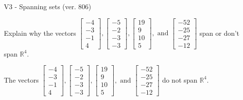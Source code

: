 \begin{exercise}
  \begin{exerciseTitle}V3 - Spanning sets (ver. 806)\end{exerciseTitle}
  \begin{exerciseStatement}
    Explain why the vectors \(\left[\begin{array}{r}
-4 \\
-3 \\
-1 \\
4
\end{array}\right] , \left[\begin{array}{r}
-5 \\
-2 \\
-3 \\
-3
\end{array}\right] , \left[\begin{array}{r}
19 \\
9 \\
10 \\
5
\end{array}\right] , \text{ and } \left[\begin{array}{r}
-52 \\
-25 \\
-27 \\
-12
\end{array}\right]\) span or don't span \(\mathbb{R}^4\). 
	


  \end{exerciseStatement}
  \begin{exerciseAnswer}
   The vectors \(\left[\begin{array}{r}
-4 \\
-3 \\
-1 \\
4
\end{array}\right] , \left[\begin{array}{r}
-5 \\
-2 \\
-3 \\
-3
\end{array}\right] , \left[\begin{array}{r}
19 \\
9 \\
10 \\
5
\end{array}\right] , \text{ and } \left[\begin{array}{r}
-52 \\
-25 \\
-27 \\
-12
\end{array}\right]\) 
  	 do not  
	span \(\mathbb{R}^4\).
  


  \end{exerciseAnswer}
\end{exercise}